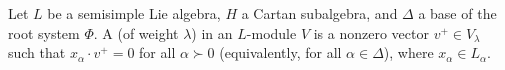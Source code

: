 Let $L$ be a semisimple Lie algebra, $H$ a Cartan subalgebra, and $\Delta$ a base of the root system $\Phi$. A  (of weight $\lambda$) in an $L$-module $V$ is a nonzero vector $v^+ \in V_\lambda$ such that $x_\alpha \cdot v^+ = 0$ for all $\alpha \succ 0$ (equivalently, for all $\alpha \in \Delta$), where $x_\alpha \in L_\alpha$.
